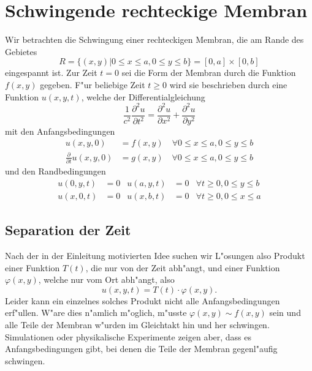 \section{Schwingende rechteckige Membran}
Wir betrachten die Schwingung einer rechteckigen Membran, die am Rande
des Gebietes
\[
R=\{(x,y)|0\le x\le a,0\le y\le b\} =[0,a]\times[0,b]
\]
eingespannt ist. Zur Zeit $t=0$ sei die Form der Membran durch die
Funktion $f(x,y)$ gegeben.
F"ur beliebige Zeit $t\ge 0$ wird sie beschrieben durch eine Funktion $u(x,y,t)$,
welche der Differentialgleichung
\[
\frac1{c^2}\frac{\partial^2u}{\partial t^2}=\frac{\partial^2u}{\partial x^2}+\frac{\partial^2u}{\partial y^2}
\]
mit den Anfangsbedingungen
\begin{align*}
u(x,y,0)&=f(x,y)\quad\forall 0\le x\le a,0\le y\le b
\\
\frac{\partial}{\partial t}u(x,y,0)&=g(x,y)\quad\forall 0\le x\le a,0\le y\le b
\end{align*}
und den Randbedingungen
\begin{align*}
u(0,y,t)&=0&u(a,y,t)&=0&\forall t\ge 0,0\le y\le b\\
u(x,0,t)&=0&u(x,b,t)&=0&\forall t\ge 0,0\le x\le a
\end{align*}

\subsection{Separation der Zeit}
Nach der in der Einleitung motivierten Idee suchen wir L"osungen also
Produkt einer Funktion $T(t)$, die nur von der Zeit abh"angt, und einer Funktion
$\varphi(x,y)$, welche nur vom Ort abh"angt, also
\[
u(x,y,t)=T(t)\cdot\varphi(x,y).
\]
Leider kann ein einzelnes solches Produkt nicht alle Anfangsbedingungen
erf"ullen. W"are dies n"amlich m"oglich, m"usste $\varphi(x,y)\sim f(x,y)$
sein und alle Teile der Membran w"urden im Gleichtakt hin und her schwingen.
Simulationen oder physikalische Experimente zeigen aber, dass es
Anfangsbedingungen gibt, bei denen die Teile der Membran gegenl"aufig
schwingen.

